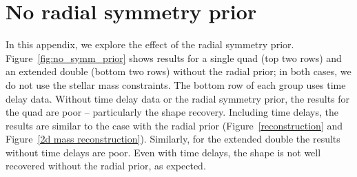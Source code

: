 \documentclass[galley,usenatbib]{mn2e}
\newcommand{\figref}[1] {Figure~\ref{#1}}
\begin{document}
\section{No radial symmetry prior}\label{no_symm_prior}

In this appendix, we explore the effect of the radial symmetry prior.
\figref{fig:no_symm_prior} shows results for a single quad (top two rows) and
an extended double (bottom two rows) without the radial prior; in both cases,
we do not use the stellar mass constraints. The bottom row of each group uses
time delay data. Without time delay data or the radial symmetry prior, the
results for the quad are poor -- particularly the shape recovery. Including
time delays, the results are similar to the case with the radial prior
(\figref{reconstruction} and \figref{2d mass reconstruction}). Similarly, for
the extended double the results without time delays are poor. Even with time
delays, the shape is not well recovered without the radial prior, as expected.
\end{document}

